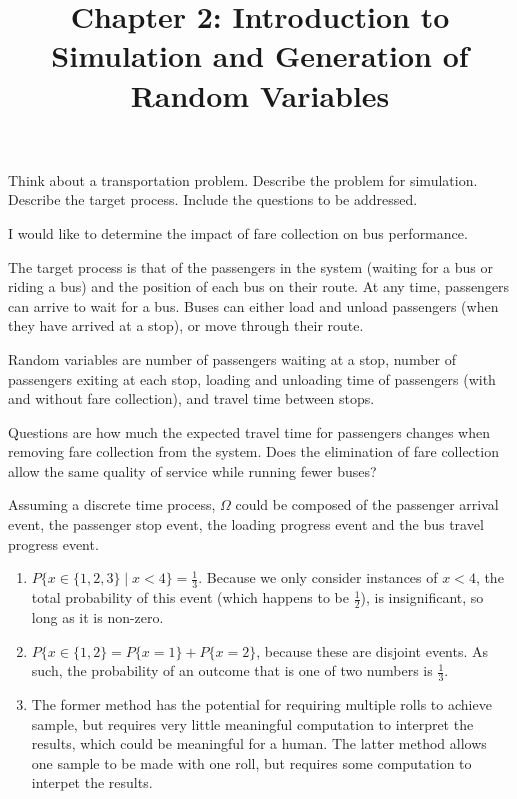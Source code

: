 \documentclass{article}
\title{Chapter 2: Introduction to Simulation and Generation of Random
Variables}
\begin{document}
\begin{enumerate}

     Think about a transportation problem. Describe the
    problem for simulation. Describe the target process. Include the
    questions to be addressed.

    I would like to determine the impact of fare collection on bus
    performance.

    The target process is that of the passengers in the system (waiting
    for a bus or riding a bus) and the position of each bus on their
    route. At any time, passengers can arrive to wait for a bus. Buses
    can either load and unload passengers (when they have arrived at a
    stop), or move through their route.

    Random variables are number of passengers waiting at a stop, number
    of passengers exiting at each stop, loading and unloading time of
    passengers (with and without fare collection), and travel time
    between stops.

    Questions are how much the expected travel time for passengers
    changes when removing fare collection from the system. Does the
    elimination of fare collection allow the same quality of service
    while running fewer buses?


    Assuming a discrete time process, $\Omega$ could be composed of the
    passenger arrival event, the passenger stop event, the loading
    progress event and the bus travel progress event.


    \begin{enumerate}
        \item $P\{x\in\{1,2,3\} \mid x < 4\} = \frac{1}{3}$. Because we
            only consider instances of $x < 4$, the total probability of
            this event (which happens to be $\frac{1}{2}$), is
            insignificant, so long as it is non-zero.
        \item $P\{x\in\{1,2\} = P\{x = 1\} + P\{x = 2\}$, because these
                are disjoint events. As such, the probability of an
                outcome that is one of two numbers is $\frac{1}{3}$.
        \item The former method has the potential for requiring multiple
            rolls to achieve sample, but requires very little meaningful
            computation to interpret the results, which could be
            meaningful for a human. The latter method allows one sample
            to be made with one roll, but requires some computation to
            interpet the results.
    \end{enumerate}

\end{enumerate}
\end{document}
